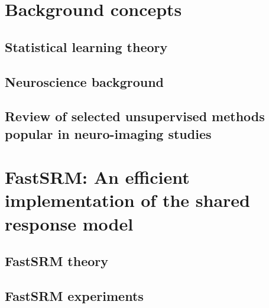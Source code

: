 \documentclass[ twoside,openright,titlepage,numbers=noenddot,%
                headinclude,footinclude,cleardoublepage=empty,abstract=on,
                BCOR=5mm,paper=a4,fontsize=11pt, 
                ]{scrreprt}
\begin{document}
\frenchspacing
\raggedbottom
{} %
\pagestyle{plain}
% 

% 

\cleardoublepage
\pagestyle{scrheadings}
\cleardoublepage



\part{Background concepts}
\chapter{Statistical learning theory}

\chapter{Neuroscience background}

\chapter{Review of selected unsupervised methods popular in neuro-imaging studies}

\part{FastSRM: An efficient implementation of the shared response model}
\label{part:fastsrm}
\chapter{FastSRM theory}
\label{ch:fastsrm1}

\chapter{FastSRM experiments}
\label{ch:fastsrm2}

\end{document}
